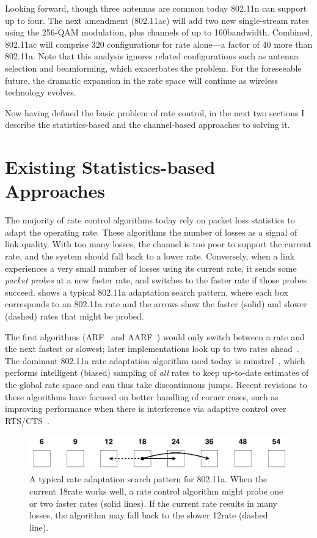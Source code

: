 Looking forward, though three antennas are common today 802.11n can support up to four. The next amendment (802.11ac) will add two new single-stream rates using the 256-QAM modulation, plus channels of up to 160\MHz bandwidth. Combined, 802.11ac will comprise 320 configurations for rate alone---a factor of 40 more than 802.11a. Note that this analysis ignores related configurations such as antenna selection and beamforming, which exacerbates the problem. For the foreseeable future, the dramatic expansion in the rate space will continue as wireless technology evolves.

Now having defined the basic problem of rate control, in the next two sections I describe the statistics-based and the channel-based approaches to solving it.

\section{Existing Statistics-based Approaches}
The majority of rate control algorithms today rely on packet loss statistics to adapt the operating rate. These algorithms the number of losses as a signal of link quality. With too many losses, the channel is too poor to support the current rate, and the system should fall back to a lower rate. Conversely, when a link experiences a very small number of losses using its current rate, it sends some \emph{packet probes} at a new faster rate, and switches to the faster rate if those probes succeed.  shows a typical 802.11a adaptation search pattern, where each box corresponds to an 802.11a rate and the arrows show the faster (solid) and slower (dashed) rates that might be probed.

The first algorithms (ARF~\cite{Kamerman_ARF} and AARF~\cite{Lacage_AARF}) would only switch between a rate and the next fastest or slowest; later implementations look up to two rates ahead~\cite{Bicket_SampleRate}. The dominant 802.11a rate adaptation algorithm used today is minstrel~\cite{minstrel}, which performs intelligent (biased) sampling of \emph{all} rates to keep up-to-date estimates of the global rate space and can thus take discontinuous jumps. Recent revisions to these algorithms have focused on better handling of corner cases, such as improving performance when there is interference via adaptive control over RTS/CTS~\cite{minstrel,Wong_RRAA}.

\begin{figure}[t]
      \centering
      \includegraphics[scale=0.4]{figures/approach/search_11a.pdf}
      \caption[Rate adaptation search pattern for 802.11a]{\label{fig:search_11a}A typical rate adaptation search pattern for 802.11a. When the current 18\Mbps rate works well, a rate control algorithm might probe one or two faster rates (solid lines). If the current rate results in many losses, the algorithm may fall back to the slower 12\Mbps rate (dashed line).}
\end{figure}


